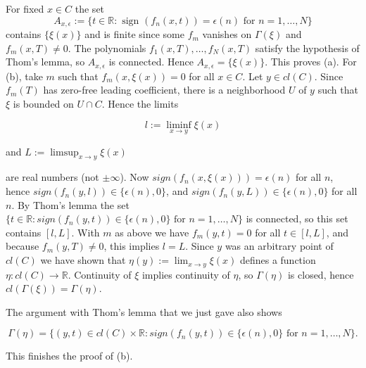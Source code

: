 \documentclass[12pt]{article}
\theoremstyle{mythm}
\let\oldendproof\endproof
\renewenvironment{proof}[1][\proofname]{%
  \oldproof[\normalfont \bfseries \sffamily #1]%
}{\oldendproof}
\renewcommand*{\proofname}{Proof}
\renewcommand*{\proofname}{Proof}
\renewcommand*{\proofname}{Proof}
\renewcommand*{\proofname}{Proof}
\renewcommand*{\proofname}{Proof}
\renewcommand*{\proofname}{Proof}
\renewcommand*{\proofname}{Proof}
\begin{document}
\begin{proof}
     For fixed \( x \in C \) the set  
\[A_{x,\epsilon} := \{ t \in \mathbb{R} : \text{ sign } (f_n(x,t)) = \epsilon(n) \text{ for } n = 1, \ldots, N\}\]  
contains \(\{\xi(x)\}\) and is finite since some \( f_m \) vanishes on \(\Gamma(\xi)\) and \( f_m(x,T) \neq 0 \). The polynomials \( f_1(x,T), \ldots, f_N(x,T) \) satisfy the hypothesis of Thom's lemma, so \( A_{x,\epsilon} \) is connected. Hence \( A_{x,\epsilon} = \{\xi(x)\} \). This proves (a).
For (b), take \( m \) such that \( f_m(x, \xi(x)) = 0 \) for all \( x \in C \). Let \( y \in cl(C) \). Since \( f_m(T) \) has zero-free leading coefficient, there is a neighborhood \( U \) of \( y \) such that \( \xi \) is bounded on \( U \cap C \). Hence the limits

\[l := \liminf_{x \to y} \xi(x)\]

and \( L := \limsup_{x \to y} \xi(x) \)

are real numbers (not \(\pm \infty\)). Now \( sign(f_n(x, \xi(x))) = \epsilon(n) \) for all \( n \), hence \( sign(f_n(y, l)) \in \{\epsilon(n), 0\} \), and \( sign(f_n(y, L)) \in \{\epsilon(n), 0\} \) for all \( n \). By Thom's lemma the set \(\{t \in \mathbb{R}: sign(f_n(y, t)) \in \{\epsilon(n), 0\} \text{ for } n = 1, \ldots, N\}\) is connected, so this set contains \([l, L]\). With \( m \) as above we have \( f_m(y, t) = 0 \) for all \( t \in [l, L] \), and because \( f_m(y, T) \neq 0 \), this implies \( l = L \). Since \( y \) was an arbitrary point of \( cl(C) \) we have shown that \( \eta(y) := \lim_{x \to y} \xi(x) \) defines a function \( \eta: cl(C) \to \mathbb{R} \). Continuity of \( \xi \) implies continuity of \( \eta \), so \( \Gamma(\eta) \) is closed, hence \( cl(\Gamma(\xi)) = \Gamma(\eta) \).

The argument with Thom's lemma that we just gave also shows

\[\Gamma(\eta) = \{(y, t) \in cl(C) \times \mathbb{R}: sign(f_n(y, t)) \in \{\epsilon(n), 0\} \text{ for } n = 1, \ldots, N\}.\]

This finishes the proof of (b).
\end{proof}
\end{document}
